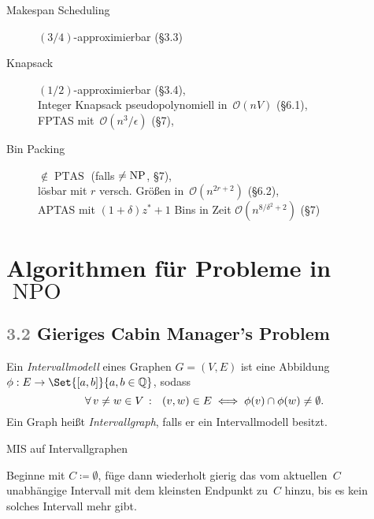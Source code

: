\documentclass{cheat-sheet}
\DeclareMathOperator{\NPO}{NPO} %
\DeclareMathOperator{\NP}{NP} %
\let\P\relax %
\DeclareMathOperator{\P}{P} %
\DeclareMathOperator{\PTAS}{PTAS} %
\renewcommand{\O}{\mathcal{O}} %
\newcommand{\Problem}[1]{\textcolor{ProblemColor}{\textbf{#1}}}
\newcommand{\scriptSection}[1]{\textcolor{gray}{#1}\enspace}
\begin{document}
\begin{description}
  \item[Makespan Scheduling]
    $(3/4)$-approximierbar (§3.3)

  \item[Knapsack]
    $(1/2)$-approximierbar (§3.4), \\
    Integer Knapsack pseudopolynomiell in~$\O(n V)$ (§6.1), \\
    FPTAS mit~$\O(n^3 / \epsilon)$ (§7),

  \item[Bin Packing]
    $\not\in \PTAS$ (falls $\P \neq \NP$, §7), \\
    lösbar mit $r$ versch. Größen in~$\O(n^{2r + 2})$ (§6.2), \\
    APTAS mit $(1+\delta) z^* + 1$ Bins in Zeit $\O(n^{8 / \delta^2 + 2})$ (§7)
\end{description}

\newpage

\section{Algorithmen für Probleme in~$\NPO$}


\subsection{\scriptSection{3.2} Gieriges \Problem{Cabin Manager's Problem}}

\begin{defn}
  Ein \emph{Intervallmodell} eines Graphen $G = (V, E)$ ist eine Abbildung $\phi : E \to \Set{\cinterval{a}{b}}{a, b \in \Q}$, sodass
  \[
    \forall \, {v \neq w \in V} \,:\, \enspace
    (v, w) \in E \iff \phi(v) \cap \phi(w) \neq \emptyset.
  \]
  Ein Graph heißt \emph{Intervallgraph}, falls er ein Intervallmodell besitzt.
\end{defn}

\begin{problem}
  MIS auf Intervallgraphen
\end{problem}


\begin{alg}
  Beginne mit $C \coloneqq \emptyset$, füge dann wiederholt gierig das vom aktuellen~$C$ unabhängige Intervall mit dem kleinsten Endpunkt zu~$C$ hinzu, bis es kein solches Intervall mehr gibt.
\end{alg}
\end{document}
